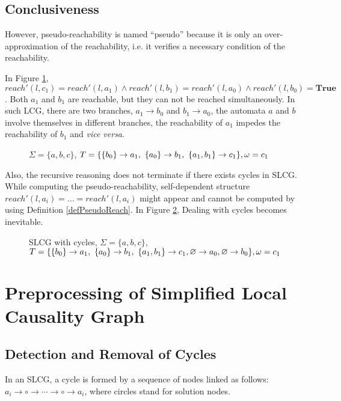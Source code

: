 \subsection{Conclusiveness}\label{sec:conclusiveness}
However, pseudo-reachability is named ``pseudo'' because it is only an over-approximation of the reachability, i.e. it verifies a necessary condition of the reachability.
\begin{example}\label{example:unreach}
    In Figure \ref{fig:limitation}, $reach'(l,c_1)=reach'(l,a_1)\land reach'(l,b_1)=reach'(l,a_0)\land reach'(l,b_0)=\textbf{True}$. Both $a_1$ and $b_1$ are reachable, but they can not be reached simultaneously.
    In such LCG, there are two branches, $a_1\to b_0$ and $b_1\to a_0$, the automata $a$ and $b$ involve themselves in different branches, the reachability of $a_1$ impedes the reachability of $b_1$ and \textit{vice versa}.
\end{example}

\begin{figure}[ht]
    \centering
    
    \caption[Limitation of SLCG 1]{$\Sigma=\{a,b,c\}$, $T=\{\acm{b_0}{a_0}{a_1},\ \acm{a_0}{b_0}{b_1},\ \acm{a_1,b_1}{c_0}{c_1}\},\omega=c_1$}
    \label{fig:limitation}
\end{figure}

Also, the recursive reasoning does not terminate if there exists cycles in SLCG. 
While computing the pseudo-reachability, self-dependent structure  $reach'(l,a_i)=\ldots=reach'(l,a_i)$ might appear and cannot be computed by using Definition \ref{defPseudoReach}. 
In Figure \ref{fig:limitation2}, 
Dealing with cycles becomes inevitable.

\begin{figure}[ht]
    \centering
    
    \caption[Limitation of SLCG 2]{SLCG with cycles, $\Sigma=\{a,b,c\}$, $T=\{\acm{b_0}{a_0}{a_1},\ \acm{a_0}{b_0}{b_1},\ \acm{a_1,b_1}{c_0}{c_1},\varnothing \to a_0, \varnothing \to b_0\},\omega=c_1$}
    \label{fig:limitation2}
\end{figure}

\section{Preprocessing of Simplified Local Causality Graph}\label{sec:chap3preprocessing}
\subsection{Detection and Removal of Cycles}\label{sec:cycles}
\begin{definition}[Cycle]
In an SLCG, a cycle is formed by a sequence of nodes linked as follows: $a_i\to \circ \to \cdots \to \circ \to a_i$, where circles stand for solution nodes.
\end{definition}

